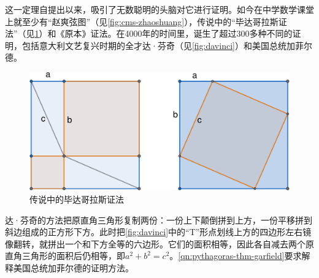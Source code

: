 \documentclass[b5paper]{ctexart}
\begin{document}
这一定理自提出以来，吸引了无数聪明的头脑对它进行证明。如今在中学数学课堂上就至少有“赵爽弦图”（见\cref{fig:cms-zhaoshuang}），传说中的“毕达哥拉斯证法”（见\cref{fig:pythagoras-pww}）和《原本》证法。在4000年的时间里，诞生了超过300多种不同的证明，包括意大利文艺复兴时期的全才达·芬奇（见\cref{fig:davinci}）和美国总统加菲尔德。

\begin{figure}[htbp]
 \centering
 \includegraphics[scale=0.25]{img/pythagoras-pww}
 \caption{传说中的毕达哥拉斯证法\label{fig:pythagoras-pww}}
\end{figure}

达·芬奇的方法把原直角三角形复制两份：一份上下颠倒拼到上方，一份平移拼到斜边组成的正方形下方。此时把\cref{fig:davinci}中的“T”形点划线上方的四边形左右镜像翻转，就拼出一个和下方全等的六边形。它们的面积相等，因此各自减去两个原直角三角形的面积后仍相等，即$a^2 + b^2 = c^2$。\cref{qn:pythagoras-thm-garfield}要求解释美国总统加菲尔德的证明方法。
\end{document}
